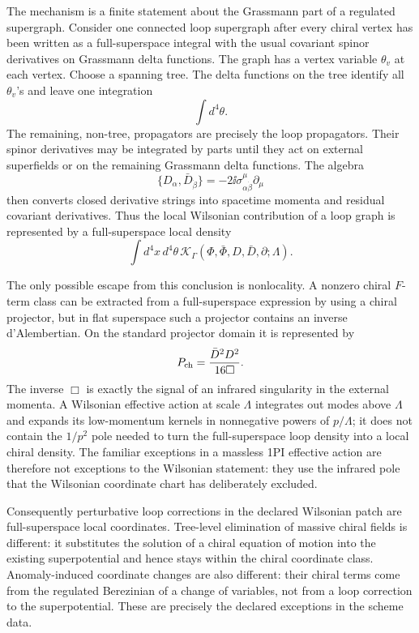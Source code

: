 The mechanism is a finite statement about the Grassmann part of a regulated
supergraph.  Consider one connected loop supergraph after every chiral vertex
has been written as a full-superspace integral with the usual covariant spinor
derivatives on Grassmann delta functions.  The graph has a vertex variable
\(\theta_v\) at each vertex.  Choose a spanning tree.  The delta functions on
the tree identify all \(\theta_v\)'s and leave one integration
\[
  \int d^4\theta .
\]
The remaining, non-tree, propagators are precisely the loop propagators.  Their
spinor derivatives may be integrated by parts until they act on external
superfields or on the remaining Grassmann delta functions.  The algebra
\[
  \{D_\alpha,\bar D_{\dot\beta}\}
  =
  -2\ii\sigma^\mu_{\alpha\dot\beta}\partial_\mu
\]
then converts closed derivative strings into spacetime momenta and residual
covariant derivatives.  Thus the local Wilsonian contribution of a loop graph
is represented by a full-superspace local density
\[
  \int d^4x\,d^4\theta\,
  \mathcal K_\Gamma(\Phi,\bar\Phi,D,\bar D,\partial;\Lambda).
\]

The only possible escape from this conclusion is nonlocality.  A nonzero
chiral \(F\)-term class can be extracted from a full-superspace expression by
using a chiral projector, but in flat superspace such a projector contains an
inverse d'Alembertian.  On the standard projector domain it is represented by
\[
  P_{\rm ch}= \frac{\bar D^2D^2}{16\Box}.
\]
The inverse \(\Box\) is exactly the signal of an infrared singularity in the
external momenta.  A Wilsonian effective action at scale \(\Lambda\) integrates
out modes above \(\Lambda\) and expands its low-momentum kernels in nonnegative
powers of \(p/\Lambda\); it does not contain the \(1/p^2\) pole needed to turn
the full-superspace loop density into a local chiral density.  The familiar
exceptions in a massless 1PI effective action are therefore not exceptions to
the Wilsonian statement: they use the infrared pole that the Wilsonian
coordinate chart has deliberately excluded.

Consequently perturbative loop corrections in the declared Wilsonian patch are
full-superspace local coordinates.  Tree-level elimination of massive chiral
fields is different: it substitutes the solution of a chiral equation of motion
into the existing superpotential and hence stays within the chiral coordinate
class.  Anomaly-induced coordinate changes are also different: their chiral
terms come from the regulated Berezinian of a change of variables, not from a
loop correction to the superpotential.  These are precisely the declared
exceptions in the scheme data.

